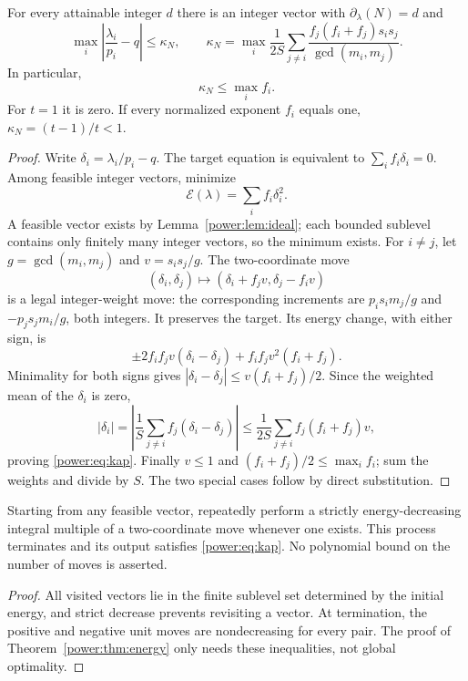 \begin{theorem}\label{power:thm:energy}
For every attainable integer $d$ there is an integer vector with
$\partial_\lambda(N)=d$ and
\begin{equation}\label{power:eq:kap}
\max_i\left|\frac{\lambda_i}{p_i}-q\right|\le\kappa_N,
\qquad
\kappa_N=\max_i\frac1{2S}\sum_{j\ne i}
\frac{f_j(f_i+f_j)s_i s_j}{\gcd(m_i,m_j)}.
\end{equation}
In particular,
\[
\kappa_N\le\max_i f_i.
\]
For $t=1$ it is zero. If every normalized exponent $f_i$ equals one,
$\kappa_N=(t-1)/t<1$.
\end{theorem}
\begin{proof}
Write $\delta_i=\lambda_i/p_i-q$. The target equation is equivalent to
$\sum_i f_i\delta_i=0$. Among feasible integer vectors, minimize
\[
\mathcal E(\lambda)=\sum_i f_i\delta_i^2.
\]
A feasible vector exists by Lemma~\ref{power:lem:ideal}; each bounded sublevel
contains only finitely many integer vectors, so the minimum exists.
For $i\ne j$, let $g=\gcd(m_i,m_j)$ and $v=s_i s_j/g$. The two-coordinate
move
\[
(\delta_i,\delta_j)\longmapsto
(\delta_i+f_jv,\delta_j-f_iv)
\]
is a legal integer-weight move: the corresponding increments are
$p_i s_i m_j/g$ and $-p_j s_j m_i/g$, both integers. It preserves the target.
Its energy change, with either sign, is
\[
\pm2f_i f_jv(\delta_i-\delta_j)+f_i f_jv^2(f_i+f_j).
\]
Minimality for both signs gives
$|\delta_i-\delta_j|\le v(f_i+f_j)/2$. Since the weighted mean of the
$\delta_i$ is zero,
\[
|\delta_i|=\left|\frac1S\sum_{j\ne i}f_j(\delta_i-\delta_j)\right|
\le\frac1{2S}\sum_{j\ne i}f_j(f_i+f_j)v,
\]
proving \eqref{power:eq:kap}. Finally $v\le1$ and
$(f_i+f_j)/2\le\max_i f_i$; sum the weights and divide by $S$.
The two special cases follow by direct substitution.
\end{proof}

\begin{corollary}\label{power:cor:algorithm}
Starting from any feasible vector, repeatedly perform a strictly
energy-decreasing integral multiple of a two-coordinate move whenever
one exists. This process terminates and its output satisfies
\eqref{power:eq:kap}. No polynomial bound on the number of moves is asserted.
\end{corollary}
\begin{proof}
All visited vectors lie in the finite sublevel set determined by the
initial energy, and strict decrease prevents revisiting a vector.
At termination, the positive and negative unit moves are nondecreasing
for every pair. The proof of Theorem~\ref{power:thm:energy} only needs these
inequalities, not global optimality.
\end{proof}

